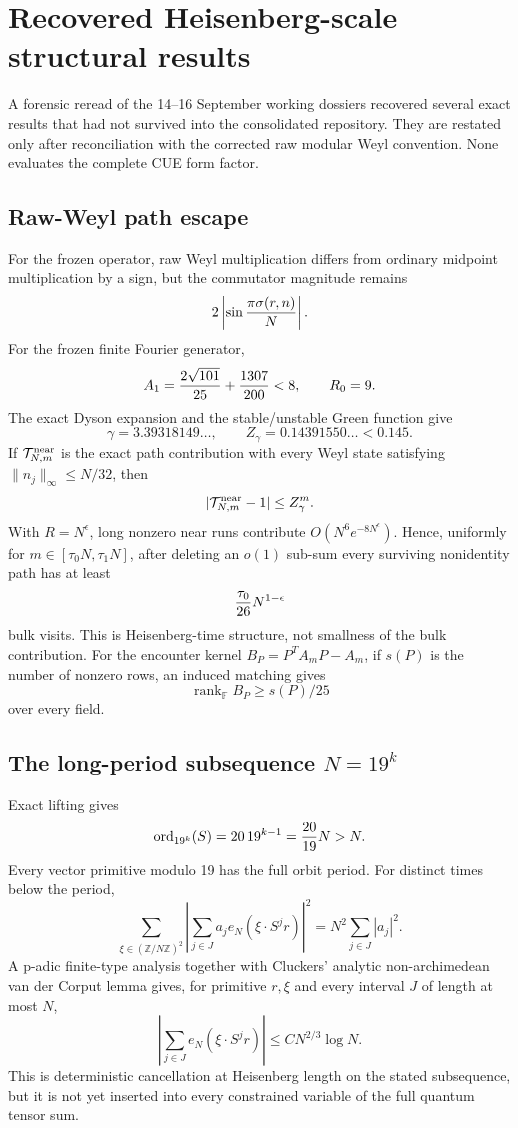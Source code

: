 \section{Recovered Heisenberg-scale structural results}
\label{sec:recovered-heisenberg-20260921}

A forensic reread of the 14--16 September working dossiers recovered several
exact results that had not survived into the consolidated repository. They
are restated only after reconciliation with the corrected raw modular Weyl
convention. None evaluates the complete CUE form factor.

\subsection{Raw-Weyl path escape}
For the frozen operator, raw Weyl multiplication differs from ordinary
midpoint multiplication by a sign, but the commutator magnitude remains
\[
2\left|\sin{\pi\sigma(r,n)\over N}\right|.
\]
For the frozen finite Fourier generator,
\[
 A_1={2\sqrt{101}\over25}+{1307\over200}<8,\qquad R_0=9.
\]
The exact Dyson expansion and the stable/unstable Green function give
\[
 \gamma=3.39318149\ldots,\qquad Z_\gamma=0.14391550\ldots<0.145.
\]
If $\mathcal T^{\rm near}_{N,m}$ is the exact path contribution with every
Weyl state satisfying $\|n_j\|_\infty\le N/32$, then
\[
 |\mathcal T^{\rm near}_{N,m}-1|\le Z_\gamma^m.
\]
With $R=N^\epsilon$, long nonzero near runs contribute
$O(N^6e^{-8N^\epsilon})$. Hence, uniformly for
$m\in[\tau_0N,\tau_1N]$, after deleting an $o(1)$ sub-sum every
surviving nonidentity path has at least
\[
 {\tau_0\over26}N^{1-\epsilon}
\]
bulk visits. This is Heisenberg-time structure, not smallness of the bulk
contribution. For the encounter kernel $B_P=P^TA_mP-A_m$, if $s(P)$ is the
number of nonzero rows, an induced matching gives
\[
 \operatorname{rank}_{\mathbb F}B_P\ge s(P)/25
\]
over every field.

\subsection{The long-period subsequence $N=19^k$}
Exact lifting gives
\[
 \operatorname{ord}_{19^k}(S)=20\,19^{k-1}={20\over19}N>N.
\]
Every vector primitive modulo 19 has the full orbit period. For distinct
times below the period,
\[
 \sum_{\xi\in(\mathbb Z/N\mathbb Z)^2}
 \left|\sum_{j\in J}a_je_N(\xi\cdot S^jr)\right|^2
 =N^2\sum_{j\in J}|a_j|^2.
\]
A p-adic finite-type analysis together with Cluckers' analytic
non-archimedean van der Corput lemma gives, for primitive $r,\xi$ and
every interval $J$ of length at most $N$,
\[
 \left|\sum_{j\in J}e_N(\xi\cdot S^jr)\right|
 \le C N^{2/3}\log N.
\]
This is deterministic cancellation at Heisenberg length on the stated
subsequence, but it is not yet inserted into every constrained variable of
the full quantum tensor sum.

